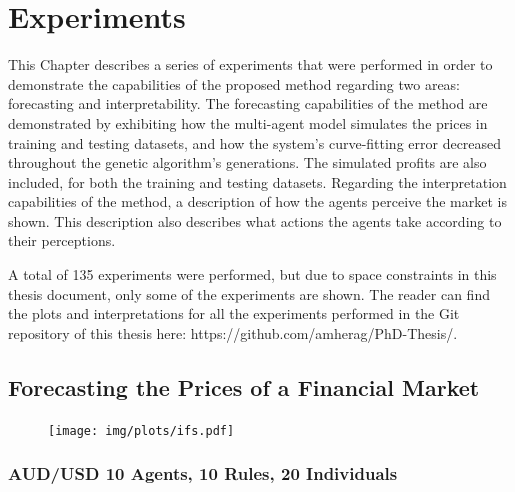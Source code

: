 \chapter{Experiments}
\label{chapter:experiments}

This Chapter describes a series of experiments that were performed in order to
demonstrate the capabilities of the proposed method regarding two areas:
forecasting and interpretability. The forecasting capabilities of the method are
demonstrated by exhibiting how the multi-agent model simulates the prices in
training and testing datasets, and how the system's curve-fitting error
decreased throughout the genetic algorithm's generations. The simulated profits
are also included, for both the training and testing datasets. Regarding the
interpretation capabilities of the method, a description of how the agents
perceive the market is shown. This description also describes what actions the
agents take according to their perceptions.

A total of 135 experiments were performed, but due to space constraints in this
thesis document, only some of the experiments are shown. The reader can find the
plots and interpretations for all the experiments performed in the Git
repository of this thesis here: https://github.com/amherag/PhD-Thesis/.


\section{Forecasting the Prices of a Financial Market}
\label{section:forecasting-the-prices-of-a-financial-market}

\begin{figure}
\caption{} \centering \texttt{[image: img/plots/ifs.pdf]}
\label{figure:ifs-proposed}
\end{figure}

\subsection{AUD/USD 10 Agents, 10 Rules, 20 Individuals}
\label{}

